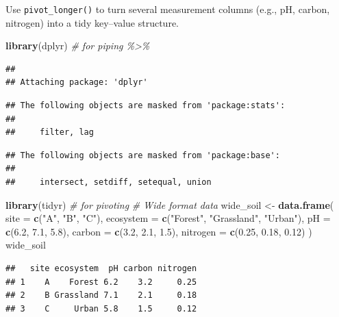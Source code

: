 \documentclass[
  10pt,
  b5paper,
  oneside]{book}
\newenvironment{Shaded}{\begin{snugshade}}{\end{snugshade}}
\newcommand{\AttributeTok}[1]{\textcolor[rgb]{0.13,0.29,0.53}{#1}}
\newcommand{\CommentTok}[1]{\textcolor[rgb]{0.56,0.35,0.01}{\textit{#1}}}
\newcommand{\FloatTok}[1]{\textcolor[rgb]{0.00,0.00,0.81}{#1}}
\newcommand{\FunctionTok}[1]{\textcolor[rgb]{0.13,0.29,0.53}{\textbf{#1}}}
\newcommand{\NormalTok}[1]{#1}
\newcommand{\OtherTok}[1]{\textcolor[rgb]{0.56,0.35,0.01}{#1}}
\newcommand{\StringTok}[1]{\textcolor[rgb]{0.31,0.60,0.02}{#1}}
\begin{document}
Use \texttt{pivot\_longer()} to turn several measurement columns (e.g., pH, carbon, nitrogen) into a tidy key--value structure.

\begin{Shaded}
\begin{Highlighting}[]
\FunctionTok{library}\NormalTok{(dplyr) }\CommentTok{\# for piping \%\textgreater{}\%}
\end{Highlighting}
\end{Shaded}

\begin{verbatim}
## 
## Attaching package: 'dplyr'
\end{verbatim}

\begin{verbatim}
## The following objects are masked from 'package:stats':
## 
##     filter, lag
\end{verbatim}

\begin{verbatim}
## The following objects are masked from 'package:base':
## 
##     intersect, setdiff, setequal, union
\end{verbatim}

\begin{Shaded}
\begin{Highlighting}[]
\FunctionTok{library}\NormalTok{(tidyr) }\CommentTok{\# for pivoting}
\CommentTok{\# Wide format data}
\NormalTok{wide\_soil }\OtherTok{\textless{}{-}} \FunctionTok{data.frame}\NormalTok{(}
 \AttributeTok{site =} \FunctionTok{c}\NormalTok{(}\StringTok{"A"}\NormalTok{, }\StringTok{"B"}\NormalTok{, }\StringTok{"C"}\NormalTok{),}
 \AttributeTok{ecosystem =} \FunctionTok{c}\NormalTok{(}\StringTok{"Forest"}\NormalTok{, }\StringTok{"Grassland"}\NormalTok{, }\StringTok{"Urban"}\NormalTok{),}
 \AttributeTok{pH =} \FunctionTok{c}\NormalTok{(}\FloatTok{6.2}\NormalTok{, }\FloatTok{7.1}\NormalTok{, }\FloatTok{5.8}\NormalTok{),}
 \AttributeTok{carbon =} \FunctionTok{c}\NormalTok{(}\FloatTok{3.2}\NormalTok{, }\FloatTok{2.1}\NormalTok{, }\FloatTok{1.5}\NormalTok{),}
 \AttributeTok{nitrogen =} \FunctionTok{c}\NormalTok{(}\FloatTok{0.25}\NormalTok{, }\FloatTok{0.18}\NormalTok{, }\FloatTok{0.12}\NormalTok{)}
\NormalTok{)}
\NormalTok{wide\_soil}
\end{Highlighting}
\end{Shaded}

\begin{verbatim}
##   site ecosystem  pH carbon nitrogen
## 1    A    Forest 6.2    3.2     0.25
## 2    B Grassland 7.1    2.1     0.18
## 3    C     Urban 5.8    1.5     0.12
\end{verbatim}
\end{document}
